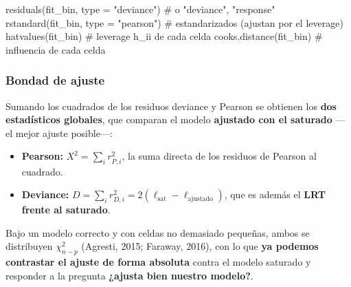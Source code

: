 \documentclass[
  letterpaper,
  DIV=11,
  numbers=noendperiod]{scrartcl}
\newenvironment{Shaded}{\begin{snugshade}}{\end{snugshade}}
\newcommand{\AttributeTok}[1]{\textcolor[rgb]{0.40,0.45,0.13}{#1}}
\newcommand{\CommentTok}[1]{\textcolor[rgb]{0.37,0.37,0.37}{#1}}
\newcommand{\FunctionTok}[1]{\textcolor[rgb]{0.28,0.35,0.67}{#1}}
\newcommand{\NormalTok}[1]{\textcolor[rgb]{0.00,0.23,0.31}{#1}}
\newcommand{\StringTok}[1]{\textcolor[rgb]{0.13,0.47,0.30}{#1}}
\providecommand{\tightlist}{%
  \setlength{\itemsep}{0pt}\setlength{\parskip}{0pt}}\usepackage{longtable,booktabs,array}
\begin{document}
\begin{tcolorbox}[enhanced jigsaw, breakable, colframe=quarto-callout-tip-color-frame, left=2mm, arc=.35mm, colbacktitle=quarto-callout-tip-color!10!white, toprule=.15mm, colback=white, coltitle=black, rightrule=.15mm, opacitybacktitle=0.6, title=\textcolor{quarto-callout-tip-color}{\faLightbulb}\hspace{0.5em}{🔧 En R. Residuos e influencia}, titlerule=0mm, toptitle=1mm, bottomtitle=1mm, leftrule=.75mm, bottomrule=.15mm, opacityback=0]

\begin{Shaded}
\begin{Highlighting}[]
\FunctionTok{residuals}\NormalTok{(fit\_bin, }\AttributeTok{type =} \StringTok{"deviance"}\NormalTok{)     }\CommentTok{\# o "deviance", "response"}
\FunctionTok{rstandard}\NormalTok{(fit\_bin, }\AttributeTok{type =} \StringTok{"pearson"}\NormalTok{)     }\CommentTok{\# estandarizados (ajustan por el leverage)}
\FunctionTok{hatvalues}\NormalTok{(fit\_bin)                        }\CommentTok{\# leverage h\_ii de cada celda}
\FunctionTok{cooks.distance}\NormalTok{(fit\_bin)                   }\CommentTok{\# influencia de cada celda}
\end{Highlighting}
\end{Shaded}

\end{tcolorbox}

\hypertarget{bondad-de-ajuste}{%
\subsubsection{Bondad de ajuste}\label{bondad-de-ajuste}}

Sumando los cuadrados de los residuos deviance y Pearson se obtienen los
\textbf{dos estadísticos globales}, que comparan el modelo
\textbf{ajustado con el saturado} ---el mejor ajuste posible---:

\begin{itemize}
\tightlist
\item
  \textbf{Pearson:} \(X^2=\sum_i r_{P,i}^2\), la suma directa de los
  residuos de Pearson al cuadrado.
\item
  \textbf{Deviance:}
  \(D=\sum_i r_{D,i}^2=2(\ell_{\text{sat}}-\ell_{\text{ajustado}})\),
  que es además el \textbf{LRT frente al saturado}.
\end{itemize}

Bajo un modelo correcto y con celdas no demasiado pequeñas, ambos se
distribuyen \(\chi^2_{n-p}\) (Agresti, 2015; Faraway, 2016), con lo que
\textbf{ya podemos contrastar el ajuste de forma absoluta} contra el
modelo saturado y responder a la pregunta \textbf{¿ajusta bien nuestro
modelo?}.
\end{document}
